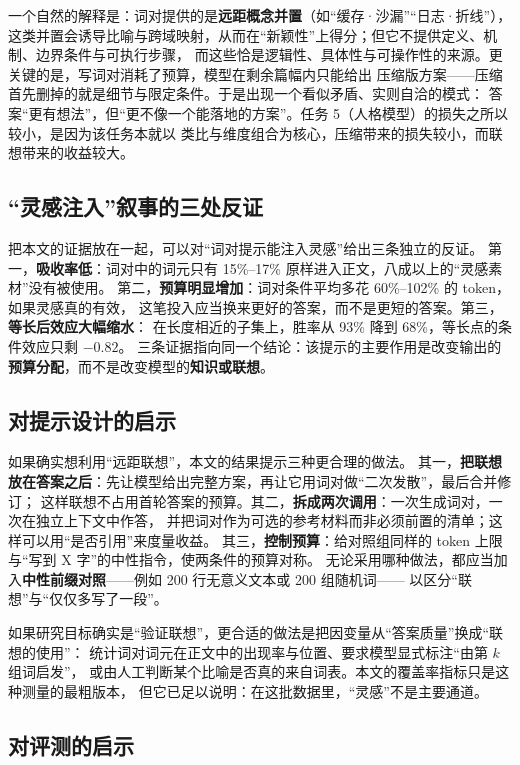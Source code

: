 \documentclass[UTF8,11pt,a4paper]{ctexart}
\begin{document}
一个自然的解释是：词对提供的是\textbf{远距概念并置}（如“缓存·沙漏”“日志·折线”），
这类并置会诱导比喻与跨域映射，从而在“新颖性”上得分；但它不提供定义、机制、边界条件与可执行步骤，
而这些恰是逻辑性、具体性与可操作性的来源。更关键的是，写词对消耗了预算，模型在剩余篇幅内只能给出
压缩版方案——压缩首先删掉的就是细节与限定条件。于是出现一个看似矛盾、实则自洽的模式：
答案“更有想法”，但“更不像一个能落地的方案”。任务 5（人格模型）的损失之所以较小，是因为该任务本就以
类比与维度组合为核心，压缩带来的损失较小，而联想带来的收益较大。

\subsection{“灵感注入”叙事的三处反证}

把本文的证据放在一起，可以对“词对提示能注入灵感”给出三条独立的反证。
第一，\textbf{吸收率低}：词对中的词元只有 15\%--17\% 原样进入正文，八成以上的“灵感素材”没有被使用。
第二，\textbf{预算明显增加}：词对条件平均多花 60\%--102\% 的 token，如果灵感真的有效，
这笔投入应当换来更好的答案，而不是更短的答案。第三，\textbf{等长后效应大幅缩水}：
在长度相近的子集上，胜率从 93\% 降到 68\%，等长点的条件效应只剩 $-0.82$。
三条证据指向同一个结论：该提示的主要作用是改变输出的\textbf{预算分配}，而不是改变模型的\textbf{知识或联想}。

\subsection{对提示设计的启示}\label{sec:design}

如果确实想利用“远距联想”，本文的结果提示三种更合理的做法。
其一，\textbf{把联想放在答案之后}：先让模型给出完整方案，再让它用词对做“二次发散”，最后合并修订；
这样联想不占用首轮答案的预算。其二，\textbf{拆成两次调用}：一次生成词对，一次在独立上下文中作答，
并把词对作为可选的参考材料而非必须前置的清单；这样可以用“是否引用”来度量收益。
其三，\textbf{控制预算}：给对照组同样的 token 上限与“写到 X 字”的中性指令，使两条件的预算对称。
无论采用哪种做法，都应当加入\textbf{中性前缀对照}——例如 200 行无意义文本或 200 组随机词——
以区分“联想”与“仅仅多写了一段”。

如果研究目标确实是“验证联想”，更合适的做法是把因变量从“答案质量”换成“联想的使用”：
统计词对词元在正文中的出现率与位置、要求模型显式标注“由第 $k$ 组词启发”，
或由人工判断某个比喻是否真的来自词表。本文的覆盖率指标只是这种测量的最粗版本，
但它已足以说明：在这批数据里，“灵感”不是主要通道。

\subsection{对评测的启示}
\end{document}
